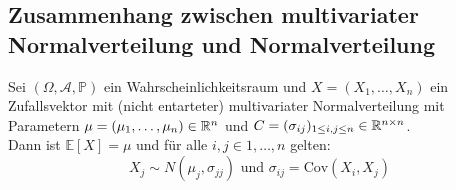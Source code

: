 \subsection{Zusammenhang zwischen multivariater Normalverteilung und Normalverteilung}
\begin{Satz}
	Sei $ (\Omega,\mathcal{A},\mathbb{P}) $ ein Wahrscheinlichkeitsraum und $ X = (X_1,\dots,X_n) $ ein Zufallsvektor mit (nicht entarteter) multivariater Normalverteilung mit Parametern $ \mu = (\mu_1,\dots,\mu_n) \in \mathbb{R}^n $ und $ C = (\sigma_{ij})_{1 \leq i,j \leq n} \in \mathbb{R}^{n \times n} $.\\
	Dann ist $ \mathbb{E}[X] = \mu $ und für alle $ i,j \in {1,\dots,n}  $ gelten:
	\[
		 X_j \sim N(\mu_j,\sigma_{jj}) \text{ und } \sigma_{ij} = \text{Cov}(X_i,X_j)
	\]
\end{Satz}
